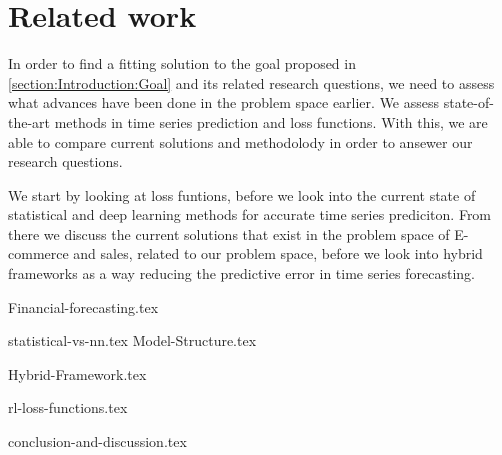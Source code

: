 \chapter{Related work}
\label{section:RelatedWork}

\iffalse
Our problem can be composed into two main categories.
time series forecasting, and e-commerce trend forecasting.
What is the characteristics of e-commerce trend forecasting?
The domain consists of multiple time series, some which correlate.
The time series contains multiple periods, for example users shop
online ofter on sundays than on mondays. 
Some categories are popular in the spring, others in the fall.
Mabye online shopping spikes around common paydays?
\fi


In order to find a fitting solution to the goal proposed in \ref{section:Introduction:Goal} and its related research questions,
we need to assess what advances have been done in the problem space earlier.
We assess state-of-the-art methods in time series prediction and loss functions.
With this, we are able to compare current solutions and methodolody in order to ansewer our research questions.

We start by looking at loss funtions, before we look into the current state of statistical and deep learning methods for accurate time series prediciton.
From there we discuss the current solutions that exist in the problem space of E-commerce and sales, related to our problem space,
before we look into hybrid frameworks as a way reducing the predictive error in time series forecasting.



{Financial-forecasting.tex}

{statistical-vs-nn.tex}
{Model-Structure.tex}

{Hybrid-Framework.tex}

{rl-loss-functions.tex}

{conclusion-and-discussion.tex}